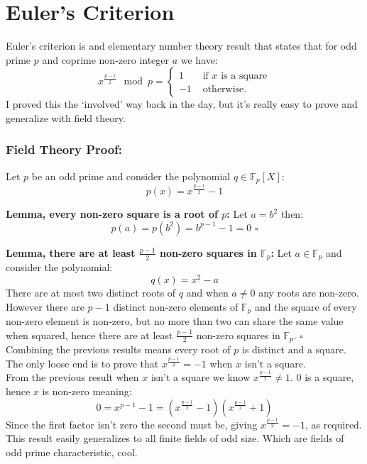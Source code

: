 
\section{Euler's Criterion}
Euler's criterion is and elementary number theory result that states that for odd prime $p$ and coprime non-zero integer $a$ we have:
\[x^{\frac{p-1}{2}}\mod p = \begin{cases} 1 & \text{ if $x$ is a square}\\ -1 & \text{ otherwise.}\end{cases}\]
I proved this the `involved' way back in the day,
but it's really easy to prove and generalize with field theory.

\subsubsection{Field Theory Proof:}
Let $p$ be an odd prime and consider the polynomial $q\in\mathbb{F}_p[X]$:
\[p(x) = x^{\frac{p-1}{2}}-1\]

\textbf{Lemma, every non-zero square is a root of $p$:}
Let $a=b^2$ then:
\[p(a) = p(b^2) = b^{p-1}-1 = 0\,\, \square\]

\textbf{Lemma, there are at least $\frac{p-1}{2}$ non-zero squares in $\mathbb{F}_p$:}
Let $a\in \mathbb{F}_p$ and consider the polynomial:
\[q(x) = x^2-a\]
There are at most two distinct roots of $q$ and when $a\neq 0$ any roots are non-zero.
However there are $p-1$ distinct non-zero elements of $\mathbb{F}_p$ and the square of every non-zero element is non-zero,
but no more than two can share the same value when squared,
hence there are at least $\frac{p-1}{2}$ non-zero squares in $\mathbb{F}_p$. $\square$
\\

Combining the previous results means every root of $p$ is distinct and a square.
The only loose end is to prove that $x^\frac{p-1}{2}=-1$ when $x$ isn't a square.
\\

From the previous result when $x$ isn't a square we know $x^\frac{p-1}{2}\neq 1$.
$0$ is a square, hence $x$ is non-zero meaning:
\[0 = x^{p-1}-1=\left(x^{\frac{p-1}{2}}-1\right)\left(x^{\frac{p-1}{2}}+1\right)\]
Since the first factor isn't zero the second must be,
giving $x^{\frac{p-1}{2}}=-1$, as required.
\\

This result easily generalizes to all finite fields of odd size.
Which are fields of odd prime characteristic,
cool.

